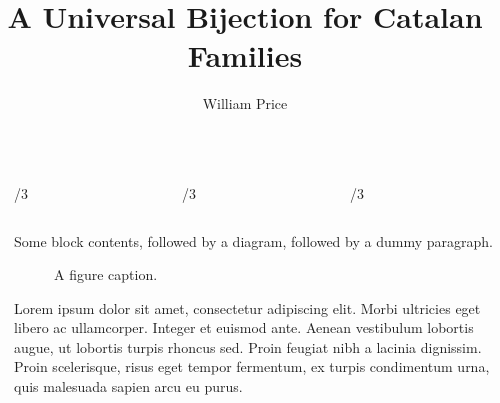 \documentclass[final]{beamer}
\title{A Universal Bijection for Catalan Families}
\author{William Price}
\institute[shortinst]{Supervisor: Richard Brak}
\newlength{\sepwidth}
\newlength{\colwidth}
\newcommand{\separatorcolumn}{\begin{column}{\sepwidth}\end{column}}
\begin{document}
\begin{frame}[t]
\begin{columns}[t]
\separatorcolumn

\begin{column}{\colwidth}

  \begin{columns}[t]
    \begin{column}{\colwidth/3}
    \end{column}
    
    \begin{column}{\colwidth/3}
    \end{column}
    
    \begin{column}{\colwidth/3}
    \end{column}
    
  \end{columns}


    Some block contents, followed by a diagram, followed by a dummy paragraph.

    \begin{figure}
      \centering
      \caption{A figure caption.}
    \end{figure}

    Lorem ipsum dolor sit amet, consectetur adipiscing elit. Morbi ultricies
    eget libero ac ullamcorper. Integer et euismod ante. Aenean vestibulum
    lobortis augue, ut lobortis turpis rhoncus sed. Proin feugiat nibh a
    lacinia dignissim. Proin scelerisque, risus eget tempor fermentum, ex
    turpis condimentum urna, quis malesuada sapien arcu eu purus.


\end{column}
\end{columns}
\end{frame}
\end{document}

